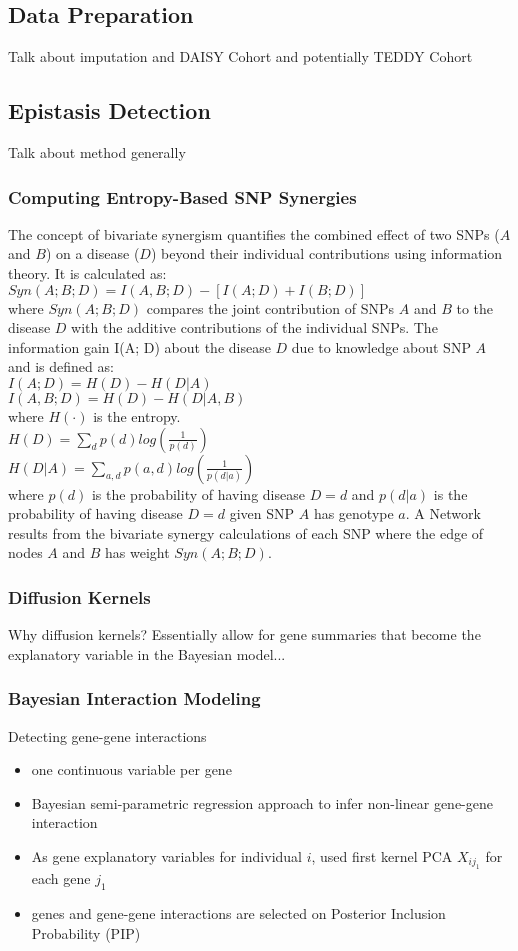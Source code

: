 \documentclass{article}\usepackage[]{graphicx}\usepackage[]{color}
\begin{document}
\subsection{Data Preparation}
Talk about imputation and DAISY Cohort and potentially TEDDY Cohort
\subsection{Epistasis Detection}
Talk about method generally
\subsubsection{Computing Entropy-Based SNP Synergies}
The concept of bivariate synergism quantifies the combined effect of two SNPs ($A$ and $B$) on a disease ($D$) beyond their individual contributions using information theory. It is calculated as:\\
$Syn(A; B; D) = I(A, B; D) -[I(A; D) + I(B; D)]$\\
where $Syn(A; B; D)$ compares the joint contribution of SNPs $A$ and $B$ to the disease $D$ with the additive contributions of the individual SNPs. The information gain I(A; D) about the disease $D$ due to knowledge about SNP $A$ and is defined as:\\
$I(A; D) = H(D) - H(D|A) $\\
$I(A, B; D) = H(D) - H(D|A, B)$ \\ where $H(\cdot)$ is the entropy. \\
$H(D) = \sum_d p(d)log(\frac{1}{p(d)})$\\
$H(D|A) = \sum_{a,d} p(a,d)log(\frac{1}{p(d|a)})$\\ where $p(d)$ is the probability of having disease $D=d$ and $p(d|a)$ is the probability of having disease $D=d$ given SNP $A$ has genotype $a$.
A Network results from the bivariate synergy calculations of each SNP where the edge of nodes $A$ and $B$ has weight $Syn(A; B; D)$.
\subsubsection{Diffusion Kernels}
Why diffusion kernels? Essentially allow for gene summaries that become the explanatory variable in the Bayesian model...
\subsubsection{Bayesian Interaction Modeling}
Detecting gene-gene interactions
\begin{itemize}
\item one continuous variable per gene
\item Bayesian semi-parametric regression approach to infer non-linear gene-gene interaction
\item As gene explanatory variables for individual $i$, used first kernel PCA $X_{ij_1}$ for each gene $j_1$
\item genes and gene-gene interactions are selected on Posterior Inclusion Probability (PIP)
\end{itemize}
\end{document}
